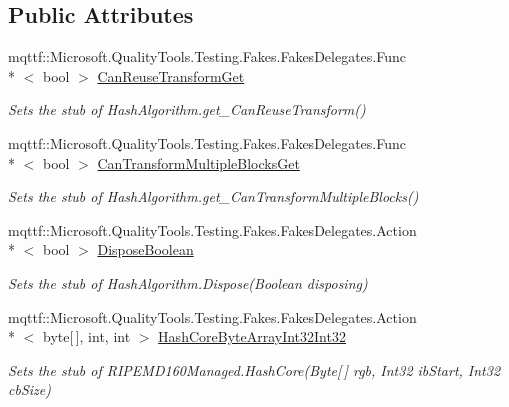 \subsection*{Public Attributes}
\begin{DoxyCompactItemize}
\item 
mqttf\-::\-Microsoft.\-Quality\-Tools.\-Testing.\-Fakes.\-Fakes\-Delegates.\-Func\\*
$<$ bool $>$ \hyperlink{class_system_1_1_security_1_1_cryptography_1_1_fakes_1_1_stub_r_i_p_e_m_d160_managed_a256df7b348652b2d4e647e77c977172d}{Can\-Reuse\-Transform\-Get}
\begin{DoxyCompactList}\small\item\em Sets the stub of Hash\-Algorithm.\-get\-\_\-\-Can\-Reuse\-Transform()\end{DoxyCompactList}\item 
mqttf\-::\-Microsoft.\-Quality\-Tools.\-Testing.\-Fakes.\-Fakes\-Delegates.\-Func\\*
$<$ bool $>$ \hyperlink{class_system_1_1_security_1_1_cryptography_1_1_fakes_1_1_stub_r_i_p_e_m_d160_managed_aef875457ce1dce474a45b975dd6409ba}{Can\-Transform\-Multiple\-Blocks\-Get}
\begin{DoxyCompactList}\small\item\em Sets the stub of Hash\-Algorithm.\-get\-\_\-\-Can\-Transform\-Multiple\-Blocks()\end{DoxyCompactList}\item 
mqttf\-::\-Microsoft.\-Quality\-Tools.\-Testing.\-Fakes.\-Fakes\-Delegates.\-Action\\*
$<$ bool $>$ \hyperlink{class_system_1_1_security_1_1_cryptography_1_1_fakes_1_1_stub_r_i_p_e_m_d160_managed_adceb78f24d8d2a96b50f84a36c9f6602}{Dispose\-Boolean}
\begin{DoxyCompactList}\small\item\em Sets the stub of Hash\-Algorithm.\-Dispose(\-Boolean disposing)\end{DoxyCompactList}\item 
mqttf\-::\-Microsoft.\-Quality\-Tools.\-Testing.\-Fakes.\-Fakes\-Delegates.\-Action\\*
$<$ byte\mbox{[}$\,$\mbox{]}, int, int $>$ \hyperlink{class_system_1_1_security_1_1_cryptography_1_1_fakes_1_1_stub_r_i_p_e_m_d160_managed_a431b3068806c2903bc77591fff22aef5}{Hash\-Core\-Byte\-Array\-Int32\-Int32}
\begin{DoxyCompactList}\small\item\em Sets the stub of R\-I\-P\-E\-M\-D160\-Managed.\-Hash\-Core(\-Byte\mbox{[}$\,$\mbox{]} rgb, Int32 ib\-Start, Int32 cb\-Size)\end{DoxyCompactList}\item 

\end{DoxyCompactItemize}
